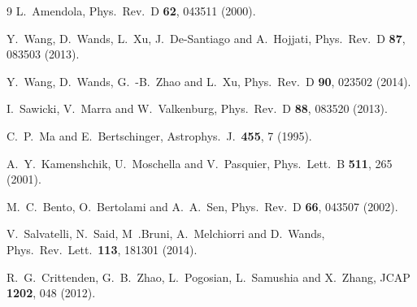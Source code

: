 \documentclass[prd,twocolumn,preprintnumbers,amsmath,amssymb,nofootinbib,english,showpacs]{revtex4-1}
\begin{document}
\begin{thebibliography}{9}
  L.~Amendola,
  Phys.\ Rev.\ D {\bf 62}, 043511 (2000).

  Y.~Wang, D.~Wands, L.~Xu, J.~De-Santiago and A.~Hojjati,
  Phys.\ Rev.\ D {\bf 87}, 083503 (2013).

  Y.~Wang, D.~Wands, G.~-B.~Zhao and L.~Xu,
  Phys.\ Rev.\ D {\bf 90}, 023502 (2014).

  I.~Sawicki, V.~Marra and W.~Valkenburg,
  Phys.\ Rev.\ D {\bf 88}, 083520 (2013).

  C.~P.~Ma and E.~Bertschinger,
  Astrophys.\ J.\ {\bf 455}, 7 (1995).

  A.~Y.~Kamenshchik, U.~Moschella and V.~Pasquier,
  Phys.\ Lett.\ B {\bf 511}, 265 (2001).

  M.~C.~Bento, O.~Bertolami and A.~A.~Sen,
  Phys.\ Rev.\ D {\bf 66}, 043507 (2002).

  V.~Salvatelli, N.~Said, M~.Bruni, A.~Melchiorri and D.~Wands,
  Phys.\ Rev.\ Lett.\ {\bf 113}, 181301 (2014).

  R.~G.~Crittenden, G.~B.~Zhao, L.~Pogosian, L.~Samushia and X.~Zhang,
  JCAP {\bf 1202}, 048  (2012).


\end{thebibliography}
\end{document}

